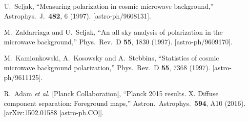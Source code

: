 \documentclass[12pt]{article}
\begin{document}
\begin{thebibliography}{99}
  U.~Seljak,
  ``Measuring polarization in cosmic microwave background,''
Astrophys.\ J.\  {\bf 482}, 6 (1997).
[astro-ph/9608131].

  M.~Zaldarriaga and U.~Seljak,
  ``An all sky analysis of polarization in the microwave background,''
Phys.\ Rev.\ D {\bf 55}, 1830 (1997).
[astro-ph/9609170].


  M.~Kamionkowski, A.~Kosowsky and A.~Stebbins,
  ``Statistics of cosmic microwave background polarization,''
Phys.\ Rev.\ D {\bf 55}, 7368 (1997).
[astro-ph/9611125].

  R.~Adam {\it et al.} [Planck Collaboration],
  ``Planck 2015 results. X. Diffuse component separation: Foreground maps,''
Astron.\ Astrophys.\  {\bf 594}, A10 (2016).
[arXiv:1502.01588 [astro-ph.CO]].

  



\end{thebibliography}
\end{document}
